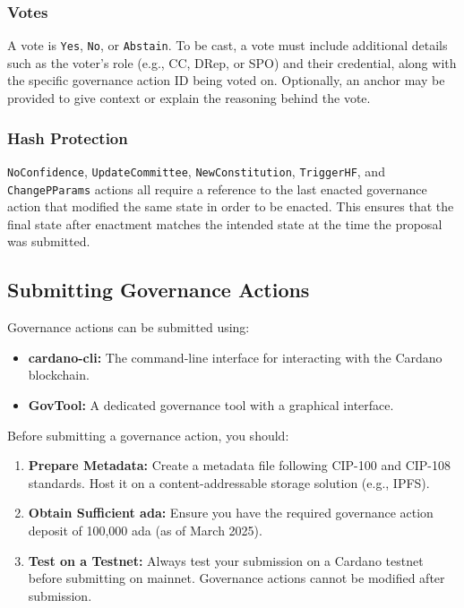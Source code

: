 \subsubsection{Votes}
A vote is \texttt{Yes}, \texttt{No}, or \texttt{Abstain}. To be cast, a vote must include additional details such as the voter's role (e.g., CC, DRep, or SPO) and their credential, along with the specific governance action ID being voted on. Optionally, an anchor may be provided to give context or explain the reasoning behind the vote.

\subsubsection{Hash Protection}
\texttt{NoConfidence}, \texttt{UpdateCommittee}, \texttt{NewConstitution}, \texttt{TriggerHF}, and \texttt{ChangePParams} actions all require a reference to the last enacted governance action that modified the same state in order to be enacted. This ensures that the final state after enactment matches the intended state at the time the proposal was submitted.

\subsection{Submitting Governance Actions}

Governance actions can be submitted using:

\begin{itemize}
    \item \textbf{cardano-cli:} The command-line interface for interacting with the Cardano blockchain.
    \item \textbf{GovTool:} A dedicated governance tool with a graphical interface.
\end{itemize}

Before submitting a governance action, you should:

\begin{enumerate}
    \item \textbf{Prepare Metadata:} Create a metadata file following CIP-100 and CIP-108 standards. Host it on a content-addressable storage solution (e.g., IPFS).
    \item \textbf{Obtain Sufficient ada:} Ensure you have the required governance action deposit of 100,000 ada (as of March 2025).
    \item \textbf{Test on a Testnet:} Always test your submission on a Cardano testnet before submitting on mainnet. Governance actions cannot be modified after submission.
\end{enumerate}


